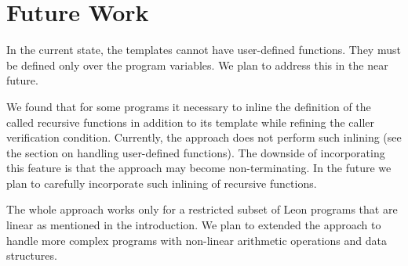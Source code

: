 \documentclass[a4paper,10pt]{article}
\begin{document}
\section{Future Work}

In the current state, the templates cannot have user-defined functions. They must be defined only over the program variables. We plan to address this in the near future.

We found that for some programs it necessary to inline the definition of the called recursive functions in addition to its template while refining the caller verification condition. Currently, the approach does not perform such inlining (see the section on handling user-defined functions). The downside of incorporating this feature is that the approach may become non-terminating. In the future we plan to carefully incorporate such inlining of recursive functions.

The whole approach works only for a restricted subset of Leon programs that are linear as mentioned in the introduction. We plan to extended the approach to handle more complex programs with non-linear arithmetic operations and data structures.



\end{document}
